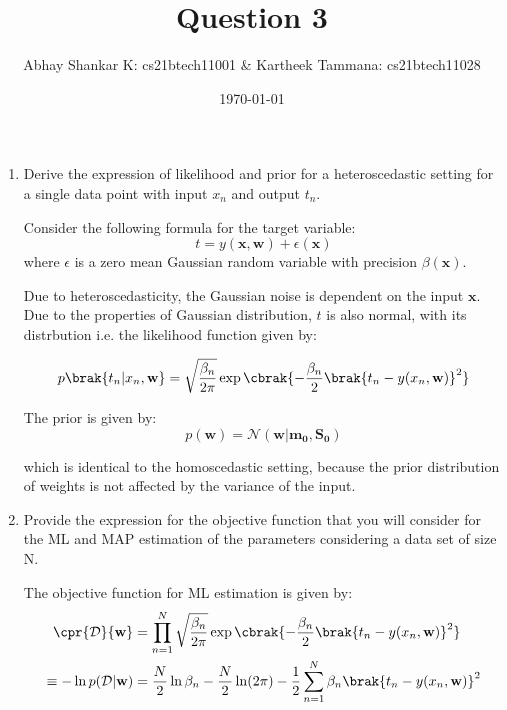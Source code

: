 \documentclass{amsart}
\begin{document}
    \title{Question 3}
    \author{Abhay Shankar K: cs21btech11001 \& Kartheek Tammana: cs21btech11028}
    \date{\today}
    \maketitle

    \begin{enumerate}
        \item Derive the expression of likelihood and prior for a heteroscedastic setting for a single data point with input \(x_n\) and output \(t_n\).
        
        Consider the following formula for the target variable:
        \[t = y(\mathbf{x, w}) + \epsilon(\mathbf{x})\] where \(\epsilon\) is a zero mean Gaussian random variable with precision \(\beta(\mathbf{x})\). 
        
        Due to heteroscedasticity, the Gaussian noise is dependent on the input \(\mathbf{x}\). Due to the properties of Gaussian distribution, \(t\) is also normal, with its distrbution i.e. the likelihood function given by:

        \[p\brak{t_n | x_n, \mathbf{w}} = \sqrt{\frac{\beta_n}{2\pi}} \exp \cbrak{- \frac{\beta_n}{2} \brak{t_n - y(x_n, \mathbf{w})}^2}\]


        The prior is given by:
        \[p(\mathbf{w}) = \mathcal{N}(\mathbf{w} | \mathbf{m_0}, \mathbf{S_0})\]

        which is identical to the homoscedastic setting, because the prior distribution of weights is not affected by the variance of the input.



        \item Provide the expression for the objective function that you will consider for the ML and MAP estimation of the parameters considering a data set of size N.
        
        The objective function for ML estimation is given by:
        \begin{align}
            \cpr{\mathcal{D}}{\mathbf{w}} &= \prod_{n = 1}^{N} \sqrt{\frac{\beta_n}{2\pi}} \exp \cbrak{- \frac{\beta_n}{2} \brak{t_n - y(x_n, \mathbf{w})}^2} \\
            \equiv -\ln p(\mathcal{D} | \mathbf{w}) &= \frac{N}{2} \ln \beta_n - \frac{N}{2} \ln (2\pi) - \frac{1}{2} \sum_{n = 1}^{N} \beta_n \brak{t_n - y(x_n, \mathbf{w})}^2 \label{eq:ml}
        \end{align}


\end{enumerate}
\end{document}
